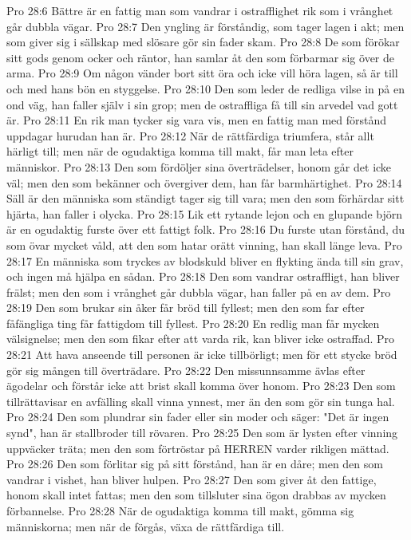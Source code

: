 Pro 28:6  Bättre är en fattig man som vandrar i ostrafflighet rik som i vrånghet går dubbla vägar.
Pro 28:7  Den yngling är förståndig, som tager lagen i akt; men som giver sig i sällskap med slösare gör sin fader skam.
Pro 28:8  De som förökar sitt gods genom ocker och räntor, han samlar åt den som förbarmar sig över de arma.
Pro 28:9  Om någon vänder bort sitt öra och icke vill höra lagen, så är till och med hans bön en styggelse.
Pro 28:10  Den som leder de redliga vilse in på en ond väg, han faller själv i sin grop; men de ostraffliga få till sin arvedel vad gott är.
Pro 28:11  En rik man tycker sig vara vis, men en fattig man med förstånd uppdagar hurudan han är.
Pro 28:12  När de rättfärdiga triumfera, står allt härligt till; men när de ogudaktiga komma till makt, får man leta efter människor.
Pro 28:13  Den som fördöljer sina överträdelser, honom går det icke väl; men den som bekänner och övergiver dem, han får barmhärtighet.
Pro 28:14  Säll är den människa som ständigt tager sig till vara; men den som förhärdar sitt hjärta, han faller i olycka.
Pro 28:15  Lik ett rytande lejon och en glupande björn är en ogudaktig furste över ett fattigt folk.
Pro 28:16  Du furste utan förstånd, du som övar mycket våld, att den som hatar orätt vinning, han skall länge leva.
Pro 28:17  En människa som tryckes av blodskuld bliver en flykting ända till sin grav, och ingen må hjälpa en sådan.
Pro 28:18  Den som vandrar ostraffligt, han bliver frälst; men den som i vrånghet går dubbla vägar, han faller på en av dem.
Pro 28:19  Den som brukar sin åker får bröd till fyllest; men den som far efter fåfängliga ting får fattigdom till fyllest.
Pro 28:20  En redlig man får mycken välsignelse; men den som fikar efter att varda rik, kan bliver icke ostraffad.
Pro 28:21  Att hava anseende till personen är icke tillbörligt; men för ett stycke bröd gör sig mången till överträdare.
Pro 28:22  Den missunnsamme ävlas efter ägodelar och förstår icke att brist skall komma över honom.
Pro 28:23  Den som tillrättavisar en avfälling skall vinna ynnest, mer än den som gör sin tunga hal.
Pro 28:24  Den som plundrar sin fader eller sin moder och säger: "Det är ingen synd", han är stallbroder till rövaren.
Pro 28:25  Den som är lysten efter vinning uppväcker träta; men den som förtröstar på HERREN varder rikligen mättad.
Pro 28:26  Den som förlitar sig på sitt förstånd, han är en dåre; men den som vandrar i vishet, han bliver hulpen.
Pro 28:27  Den som giver åt den fattige, honom skall intet fattas; men den som tillsluter sina ögon drabbas av mycken förbannelse.
Pro 28:28  När de ogudaktiga komma till makt, gömma sig människorna; men när de förgås, växa de rättfärdiga till.
